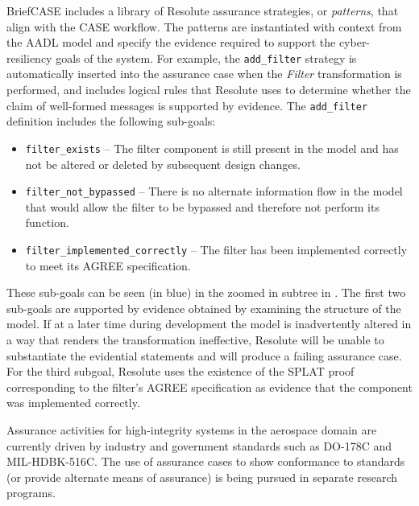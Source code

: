 BriefCASE includes a library of Resolute assurance strategies, or \emph{patterns}, that align with
the CASE workflow. The patterns are instantiated with context from the AADL model and specify the
evidence required to support the cyber-resiliency goals of the system. For example, the
\texttt{add\_filter} strategy is automatically inserted into the assurance case when the
\textit{Filter} transformation is performed, and includes logical rules that Resolute uses to
determine whether the claim of well-formed messages is supported by evidence. The \texttt{add\_filter}
definition 
includes the following sub-goals:
\begin{itemize} 
\item \texttt{filter\_exists} -- The filter component is still present in the model and has not be 
altered or deleted by subsequent design changes. 
\item \texttt{filter\_not\_bypassed} -- There is no alternate information flow in the model that 
would allow the filter to be bypassed and therefore not perform its function.   
\item \texttt{filter\_implemented\_correctly} -- The filter has been implemented correctly 
to meet its AGREE specification.  
\end{itemize}
These sub-goals can be seen (in blue) in the zoomed in subtree in .
The first two sub-goals are supported by evidence obtained by examining the structure of the model. 
If at a later time during development the model is inadvertently altered in a way that renders the transformation
ineffective, Resolute will be unable to substantiate the evidential statements and will
produce a failing assurance case.
%
For the third subgoal, Resolute uses the existence of the
SPLAT proof corresponding to the filter's AGREE specification
as evidence that the component was implemented correctly.

Assurance activities for high-integrity systems in the aerospace domain are currently driven 
by industry and government standards such as DO-178C and MIL-HDBK-516C.  The use of assurance 
cases to show conformance to standards (or provide alternate means of assurance) is being pursued 
in separate research programs.  




